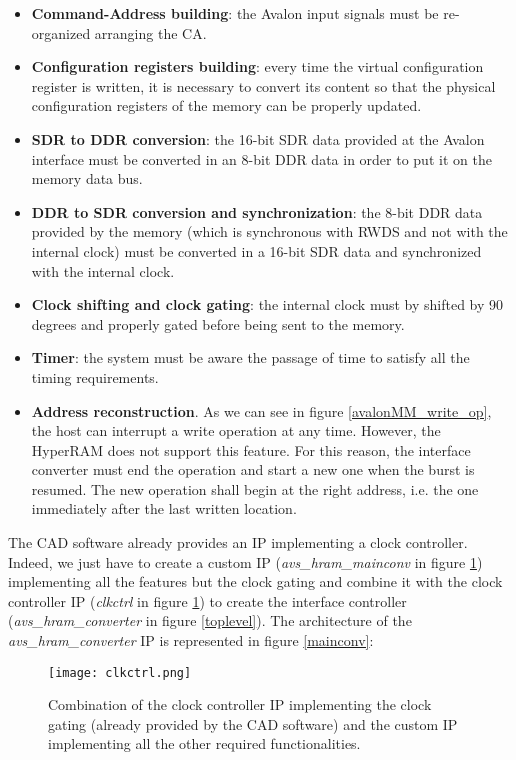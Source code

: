\documentclass[10pt, english, a4paper, titlepage, oneside]{book}
\begin{document}
\begin{itemize}
    \setlength\itemsep{2mm}
    \item \textbf{Command-Address building}: the Avalon input signals must be re-organized arranging the CA.
    \item \textbf{Configuration registers building}: every time the virtual configuration register is written, it is necessary to convert its content so that the physical configuration registers of the memory can be properly updated.
    \item \textbf{\acrshort{SDR} to \acrshort{DDR} conversion}: the 16-bit SDR data provided at the Avalon interface must be converted in an 8-bit DDR data in order to put it on the memory data bus.
    \item \textbf{DDR to SDR conversion and synchronization}: the 8-bit DDR data provided by the memory (which is synchronous with RWDS and not with the internal clock) must be converted in a 16-bit SDR data and synchronized with the internal clock.
    \item \textbf{Clock shifting and clock gating}: the internal clock must by shifted by 90 degrees and properly gated before being sent to the memory.
    \item \textbf{Timer}: the system must be aware the passage of time to satisfy all the timing requirements.
    \item \textbf{Address reconstruction}. As we can see in figure \ref{avalonMM_write_op}, the host can interrupt a write operation at any time. However, the HyperRAM does not support this feature. For this reason, the interface converter must end the operation and start a new one when the burst is resumed. The new operation shall begin at the right address, i.e. the one immediately after the last written location. 
\end{itemize}
\vspace{4mm}
The CAD software already provides an IP implementing a clock controller. Indeed, we just have to create a custom IP (\textit{avs\_hram\_mainconv} in figure \ref{clkctrl}) implementing all the features but the clock gating and combine it with the clock controller IP (\textit{clkctrl} in figure \ref{clkctrl}) to create the interface controller (\textit{avs\_hram\_converter} in figure \ref{toplevel}). The architecture of the \textit{avs\_hram\_converter} IP is represented in figure \ref{mainconv}:
\vspace{6mm}
\begin{figure}[H]
    \centering
    \captionsetup{width=15.5cm}
    \texttt{[image: clkctrl.png]}
    \vspace{4mm}
    \caption{\centering Combination of the clock controller IP implementing the clock gating (already provided by the CAD software) and the custom IP implementing all the other required functionalities.}
    \label{clkctrl}
\end{figure}
\end{document}

